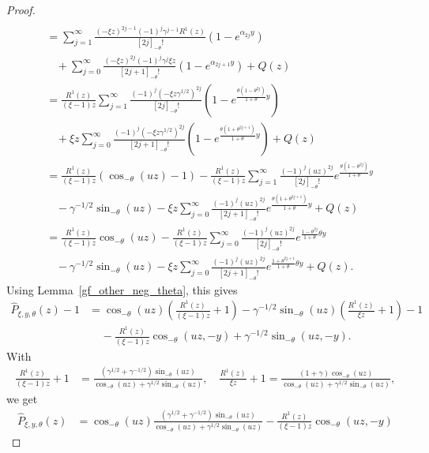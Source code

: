 \documentclass[12pt]{article}
\newcommand{\1}{\mathds{1}}
\theoremstyle{definition}
\theoremstyle{plain}
\theoremstyle{remark}
\begin{document}
\begin{proof}
\begin{align*}
     \\&=\sum_{j=1}^\infty\frac{(-\xi z)^{2j-1}(-1)^{j}\gamma^{j-1}R^1(z)}{[2j]_{-\theta}!}(1-e^{\alpha_{2j}y})
     \\&~~~~+\sum_{j=0}^\infty\frac{(-\xi z)^{2j}(-1)^{j}\gamma^{j}\xi z}{[2j+1]_{-\theta}!}(1-e^{\alpha_{2j+1}y})+Q(z) 
     \\&=\frac{R^1(z)}{(\xi-1) z}\sum_{j=1}^\infty\frac{(-1)^{j}(-\xi z\gamma^{1/2})^{2j}}{[2j]_{-\theta}!}(1-e^{\frac{\theta(1-\theta^{2j})}{1+\theta}y})
     \\&~~~~+\xi z\sum_{j=0}^\infty\frac{(-1)^{j}(-\xi z\gamma^{1/2})^{2j}}{[2j+1]_{-\theta}!}(1-e^{\frac{\theta(1+\theta^{2j+1})}{1+\theta}y})+Q(z)
     \\&=\frac{R^1(z)}{(\xi-1) z}(\cos_{-\theta}\left(uz\right)-1)-\frac{R^1(z)}{(\xi-1) z}\sum_{j=1}^\infty\frac{(-1)^{j}(uz)^{2j}}{[2j]_{-\theta}!}e^{\frac{\theta(1-\theta^{2j})}{1+\theta}y}
     \\&~~~~-\gamma^{-1/2}\sin_{-\theta}(uz)-\xi z\sum_{j=0}^\infty\frac{(-1)^{j}(uz)^{2j}}{[2j+1]_{-\theta}!}e^{\frac{\theta(1+\theta^{2j+1})}{1+\theta}y}+Q(z)
      \\&=\frac{R^1(z)}{(\xi-1) z}\cos_{-\theta}\left(uz\right)-\frac{R^1(z)}{(\xi-1) z}\sum_{j=0}^\infty\frac{(-1)^{j}(uz)^{2j}}{[2j]_{-\theta}!}e^{\frac{1-\theta^{2j}}{1+\theta}\theta y}
     \\&~~~~-\gamma^{-1/2}\sin_{-\theta}(uz)-\xi z\sum_{j=0}^\infty\frac{(-1)^{j}(uz)^{2j}}{[2j+1]_{-\theta}!}e^{\frac{1+\theta^{2j+1}}{1+\theta}\theta y}+Q(z).
  \end{align*}
Using Lemma~\ref{gf_other_neg_theta}, this gives
 \begin{align*}
     \hat{P}_{\xi,y,\theta}(z)-1
     &=\cos_{-\theta}\left(uz\right)\left(\frac{R^1(z)}{(\xi-1) z}+1\right)
     -\gamma^{-1/2}\sin_{-\theta}\left(uz\right)\left(\frac{R^1(z)}{\xi z}+1\right)-1
     \\&~~~~~-\frac{R^1(z)}{(\xi-1) z}\cos_{-\theta}(uz,-y)
     +\gamma^{-1/2}\sin_{-\theta}(uz,-y).
    \end{align*}
With 
\begin{align*}
    \frac{R^1(z)}{(\xi-1) z}+1
    &=\frac{(\gamma^{1/2}+\gamma^{-1/2})\sin_{-\theta}(uz)}{\cos_{-\theta}(uz)+\gamma^{1/2}\sin_{-\theta}(uz)}, \quad \frac{R^1(z)}{\xi z}+1
    =\frac{(1+\gamma)\cos_{-\theta}(uz)}{\cos_{-\theta}(uz)+\gamma^{1/2}\sin_{-\theta}(uz)},
\end{align*}
we get 
\begin{align*}
    \hat{P}_{\xi,y,\theta}(z)
     &=\cos_{-\theta}\left(uz\right)\frac{(\gamma^{1/2}+\gamma^{-1/2})\sin_{-\theta}(uz)}{\cos_{-\theta}(uz)+\gamma^{1/2}\sin_{-\theta}(uz)}-\frac{R^1(z)}{(\xi-1) z}\cos_{-\theta}(uz,-y)

\end{align*}
\end{proof}
\end{document}
